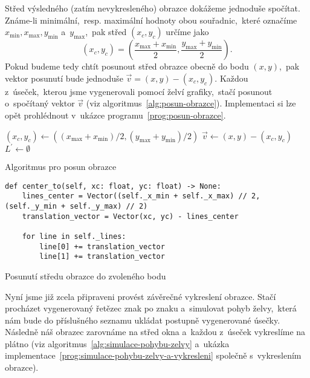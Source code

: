 Střed výsledného (zatím nevykresleného) obrazce dokážeme jednoduše spočítat. Známe-li minimální,~resp. maximální hodnoty obou souřadnic,~které označíme $x_{\text{min}},x_{\text{max}},y_{\text{min}}$ a~$y_{\text{max}}$,~pak střed $(x_c,y_c)$ určíme jako
\[(x_c,y_c)=\left(\dfrac{x_{\text{max}}+x_{\text{min}}}{2},\dfrac{y_{\text{max}}+y_{\text{min}}}{2}\right).\]
Pokud budeme tedy chtít posunout střed obrazce obecně do bodu $(x,y)$,~pak vektor posunutí bude jednoduše $\vec{v}=(x,y)-(x_c,y_c)$. Každou z~úseček,~kterou jsme vygenerovali pomocí želví grafiky,~stačí posunout o~spočítaný vektor $\vec{v}$ (viz algoritmus~\ref{alg:posun-obrazce}). Implementaci si lze opět prohlédnout v~ukázce programu~\ref{prog:posun-obrazce}.
\begin{algorithm}[h]
    $(x_c,y_c)\gets((x_{\text{max}}+x_{\text{min}})/2,(y_{\text{max}}+y_{\text{min}})/2)$\;
    $\vec{v}\gets(x,y)-(x_c,y_c)$\;
    $L^\prime\gets\emptyset$\;
    \;
    \caption{Algoritmus pro posun obrazce}
    \label{alg:posun-obrazce}
\end{algorithm}
\begin{program}[h]
\begin{lstlisting}[style=python]
def center_to(self, xc: float, yc: float) -> None:
    lines_center = Vector((self._x_min + self._x_max) // 2, (self._y_min + self._y_max) // 2)
    translation_vector = Vector(xc, yc) - lines_center

    for line in self._lines:
        line[0] += translation_vector
        line[1] += translation_vector
\end{lstlisting}
    \caption{Posunutí středu obrazce do zvoleného bodu}
    \label{prog:posun-obrazce}
\end{program}
Nyní jsme již zcela připraveni provést závěrečné vykreslení obrazce. Stačí procházet vygenerovaný řetězec znak po znaku a~simulovat pohyb želvy,~která nám bude do příslušného seznamu ukládat postupně vygenerované úsečky. Následně náš obrazec zarovnáme na střed okna a~každou z~úseček vykreslíme na plátno (viz algoritmus~\ref{alg:simulace-pohybu-zelvy} a~ukázka implementace~\ref{prog:simulace-pohybu-zelvy-a-vykresleni} společně s~vykreslením obrazce).
